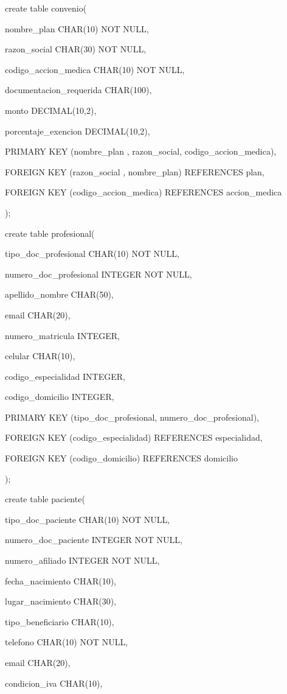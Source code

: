 \documentclass[a4paper,11pt]{article}
\begin{document}
create table convenio(

nombre\_plan   CHAR(10) NOT NULL, 

razon\_social   CHAR(30) NOT NULL,

codigo\_accion\_medica  CHAR(10) NOT NULL,

documentacion\_requerida CHAR(100),

monto    DECIMAL(10,2),

porcentaje\_exencion  DECIMAL(10,2),

PRIMARY KEY (nombre\_plan , razon\_social, codigo\_accion\_medica),

FOREIGN KEY (razon\_social , nombre\_plan) REFERENCES plan,

FOREIGN KEY (codigo\_accion\_medica) REFERENCES accion\_medica

); 

create table profesional(

tipo\_doc\_profesional  CHAR(10) NOT NULL,

numero\_doc\_profesional   INTEGER NOT NULL, 

apellido\_nombre  CHAR(50),

email    CHAR(20),

numero\_matricula  INTEGER,

celular    CHAR(10),

codigo\_especialidad  INTEGER,    

codigo\_domicilio   INTEGER,

PRIMARY KEY (tipo\_doc\_profesional, numero\_doc\_profesional),

FOREIGN KEY (codigo\_especialidad) REFERENCES especialidad,

FOREIGN KEY (codigo\_domicilio) REFERENCES domicilio

);

create table paciente(

tipo\_doc\_paciente     CHAR(10) NOT NULL, 

numero\_doc\_paciente  INTEGER NOT NULL,

numero\_afiliado  INTEGER NOT NULL,

fecha\_nacimiento  CHAR(10),

lugar\_nacimiento  CHAR(30),

tipo\_beneficiario  CHAR(10),    

telefono    CHAR(10) NOT NULL,    

email     CHAR(20),    

condicion\_iva    CHAR(10),
\end{document}
